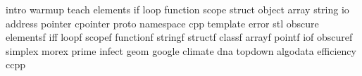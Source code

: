 intro
warmup
teach
elements
if
loop
function
scope
struct
object
array
string
io
address
pointer
cpointer
proto
namespace
cpp
template
error
stl
obscure
elementsf
iff
loopf
scopef
functionf
stringf
structf
classf
arrayf
pointf
iof
obscuref
simplex
morex
prime
infect
geom
google
climate
dna
topdown
algodata
efficiency
ccpp
